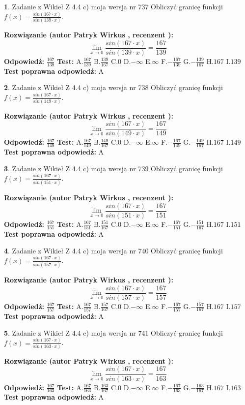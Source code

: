 \documentclass[12pt, a4paper]{article}
\theoremstyle{definition} %
\newtheorem{zad}{}
\newcommand{\zadStart}[1]{\begin{zad}#1\newline}
\newcommand{\zadStop}{\end{zad}}
\newcommand{\rozwStart}[2]{\noindent \textbf{Rozwiązanie (autor #1 , recenzent #2): }\newline}
\newcommand{\rozwStop}{\newline}
\newcommand{\odpStart}{\noindent \textbf{Odpowiedź:}\newline}
\newcommand{\odpStop}{\newline}
\newcommand{\testStart}{\noindent \textbf{Test:}\newline}
\newcommand{\testStop}{\newline}
\newcommand{\kluczStart}{\noindent \textbf{Test poprawna odpowiedź:}\newline}
\newcommand{\kluczStop}{\newline}
\begin{document}
\zadStart{Zadanie z Wikieł Z 4.4 c) moja wersja nr 737}
Obliczyć granicę funkcji $f(x)=\frac{sin(167\cdot x)}{sin(139\cdot x)}$.
\zadStop
\rozwStart{Patryk Wirkus}{}
$$\lim\limits_{x\to 0}\frac{sin(167\cdot x)}{sin(139\cdot x)}=
\frac{167}{139}$$
\rozwStop
\odpStart
$\frac{167}{139}$
\odpStop
\testStart
A.$\frac{167}{139}$
B.$\frac{139}{167}$
C.$0$
D.$-\infty$
E.$\infty$
F.$-\frac{167}{139}$
G.$-\frac{139}{167}$
H.$167$
I.$139$
\testStop
\kluczStart
A
\kluczStop



\zadStart{Zadanie z Wikieł Z 4.4 c) moja wersja nr 738}
Obliczyć granicę funkcji $f(x)=\frac{sin(167\cdot x)}{sin(149\cdot x)}$.
\zadStop
\rozwStart{Patryk Wirkus}{}
$$\lim\limits_{x\to 0}\frac{sin(167\cdot x)}{sin(149\cdot x)}=
\frac{167}{149}$$
\rozwStop
\odpStart
$\frac{167}{149}$
\odpStop
\testStart
A.$\frac{167}{149}$
B.$\frac{149}{167}$
C.$0$
D.$-\infty$
E.$\infty$
F.$-\frac{167}{149}$
G.$-\frac{149}{167}$
H.$167$
I.$149$
\testStop
\kluczStart
A
\kluczStop



\zadStart{Zadanie z Wikieł Z 4.4 c) moja wersja nr 739}
Obliczyć granicę funkcji $f(x)=\frac{sin(167\cdot x)}{sin(151\cdot x)}$.
\zadStop
\rozwStart{Patryk Wirkus}{}
$$\lim\limits_{x\to 0}\frac{sin(167\cdot x)}{sin(151\cdot x)}=
\frac{167}{151}$$
\rozwStop
\odpStart
$\frac{167}{151}$
\odpStop
\testStart
A.$\frac{167}{151}$
B.$\frac{151}{167}$
C.$0$
D.$-\infty$
E.$\infty$
F.$-\frac{167}{151}$
G.$-\frac{151}{167}$
H.$167$
I.$151$
\testStop
\kluczStart
A
\kluczStop



\zadStart{Zadanie z Wikieł Z 4.4 c) moja wersja nr 740}
Obliczyć granicę funkcji $f(x)=\frac{sin(167\cdot x)}{sin(157\cdot x)}$.
\zadStop
\rozwStart{Patryk Wirkus}{}
$$\lim\limits_{x\to 0}\frac{sin(167\cdot x)}{sin(157\cdot x)}=
\frac{167}{157}$$
\rozwStop
\odpStart
$\frac{167}{157}$
\odpStop
\testStart
A.$\frac{167}{157}$
B.$\frac{157}{167}$
C.$0$
D.$-\infty$
E.$\infty$
F.$-\frac{167}{157}$
G.$-\frac{157}{167}$
H.$167$
I.$157$
\testStop
\kluczStart
A
\kluczStop



\zadStart{Zadanie z Wikieł Z 4.4 c) moja wersja nr 741}
Obliczyć granicę funkcji $f(x)=\frac{sin(167\cdot x)}{sin(163\cdot x)}$.
\zadStop
\rozwStart{Patryk Wirkus}{}
$$\lim\limits_{x\to 0}\frac{sin(167\cdot x)}{sin(163\cdot x)}=
\frac{167}{163}$$
\rozwStop
\odpStart
$\frac{167}{163}$
\odpStop
\testStart
A.$\frac{167}{163}$
B.$\frac{163}{167}$
C.$0$
D.$-\infty$
E.$\infty$
F.$-\frac{167}{163}$
G.$-\frac{163}{167}$
H.$167$
I.$163$
\testStop
\kluczStart
A
\kluczStop
\end{document}
